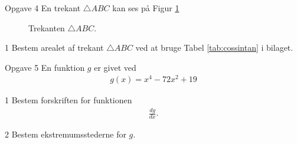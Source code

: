 %
%
%
%
%
\begin{opgavetekst}{Opgave 4}
En trekant $\triangle ABC$ kan ses på Figur \ref{fig:trekantareal}

\begin{figure}[H]
	\centering
	\caption{Trekanten $\triangle ABC$.}
	\label{fig:trekantareal}
\end{figure}
\phantom{h}
\end{opgavetekst}
\begin{delopgave}{1}
	Bestem arealet af trekant $\triangle ABC$ ved at bruge Tabel \ref{tab:cossintan} i bilaget.
\end{delopgave}
%
%
%
%
%
\newpage
\begin{opgavetekst}{Opgave 5}
	En funktion $g$ er givet ved
	\begin{align*}
		g(x) = x^4-72x^2 + 19
	\end{align*}
\end{opgavetekst}
\begin{delopgave}{1}
	Bestem forskriften for funktionen 
	\begin{align*}
		\frac{dg}{dx}.
	\end{align*}
\end{delopgave}
\begin{delopgave}{2}
	Bestem ekstremumsstederne for $g$. 
\end{delopgave}
%
%
%
%
%
